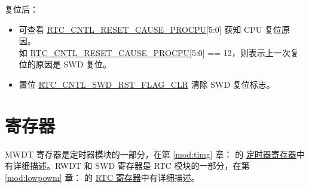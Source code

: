 \documentclass[main\_\_CN.tex]{subfiles}
\begin{document}
复位后：
\begin{itemize}
    \item 可查看 \hyperref[fielddesc:RTCCNTLRESETCAUSEPROCPU]{RTC\_CNTL\_RESET\_CAUSE\_PROCPU}[5:0] 获知 CPU 复位原因。\\
	如 \hyperref[fielddesc:RTCCNTLRESETCAUSEPROCPU]{RTC\_CNTL\_RESET\_CAUSE\_PROCPU}[5:0] == \hexprefix{}12，则表示上一次复位的原因是 SWD 复位。
	\item 置位 \hyperref[fielddesc:RTCCNTLSWDRSTFLAGCLR]{RTC\_CNTL\_SWD\_RST\_FLAG\_CLR} 清除 SWD 复位标志。
\end{itemize}

\hypertarget{wdt-reg-summ}{}
\section{寄存器}

MWDT 寄存器是定时器模块的一部分，在第 \ref{mod:timg} 章：\textit{} 的 \hyperref[timer_registers]{定时器寄存器}中有详细描述。RWDT 和 SWD 寄存器是 RTC 模块的一部分，在第 \ref{mod:lowpowm} 章： \textit{} 的 \hyperref[RTC_Register]{RTC 寄存器}中有详细描述。
\end{document}
